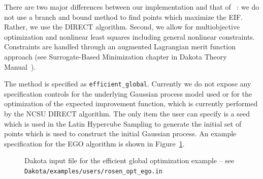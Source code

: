 There are two major differences between our implementation and that of
~\cite{Jon98}: we do not use a branch and bound method to find points
which maximize the EIF.  Rather, we use the DIRECT algorithm.  Second,
we allow for multiobjective optimization and nonlinear least squares
including general nonlinear constraints.  Constraints are handled
through an augmented Lagrangian merit function approach (see
Surrogate-Based Minimization chapter in Dakota Theory
Manual~\cite{TheoMan}).

The method is specified as \texttt{efficient\_global}.  Currently we
do not expose any specification controls for the underlying Gaussian
process model used or for the optimization of the expected improvement
function, which is currently performed by the NCSU DIRECT
algorithm. The only item the user can specify is a seed which is 
used in the Latin Hypercube Sampling to generate the initial 
set of points which is used to construct the initial Gaussian process. 
An example specification for the EGO algorithm is shown in
Figure~\ref{sbm:egm_rosen}.
\begin{figure}
  \begin{bigbox}
    \begin{small}
    \end{small}
  \end{bigbox}
  \caption{Dakota input file for the efficient global optimization example --
see \texttt{Dakota/examples/users/rosen\_opt\_ego.in} }
  \label{sbm:egm_rosen}
\end{figure}

